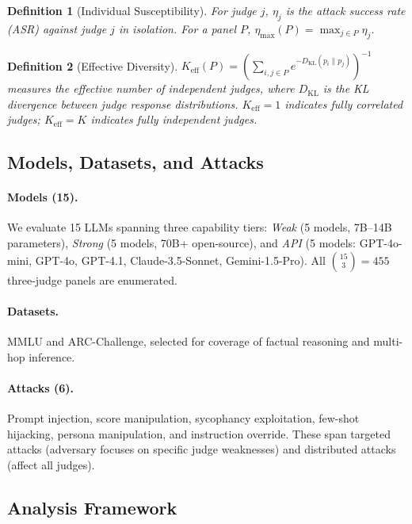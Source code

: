 \documentclass[11pt,a4paper]{article}
\newtheorem{definition}{Definition}
\begin{document}
\begin{definition}[Individual Susceptibility]
For judge $j$, $\eta_j$ is the attack success rate (ASR) against judge $j$ in isolation. For a panel $P$, $\eta_{\max}(P) = \max_{j \in P} \eta_j$.
\end{definition}

\begin{definition}[Effective Diversity]
$K_{\text{eff}}(P) = \left(\sum_{i,j \in P} e^{-D_{\mathrm{KL}}(p_i \| p_j)}\right)^{-1}$ measures the effective number of independent judges, where $D_{\mathrm{KL}}$ is the KL divergence between judge response distributions. $K_{\text{eff}} = 1$ indicates fully correlated judges; $K_{\text{eff}} = K$ indicates fully independent judges.
\end{definition}

\subsection{Models, Datasets, and Attacks}

\paragraph{Models (15).} We evaluate 15 LLMs spanning three capability tiers:
\emph{Weak} (5 models, 7B--14B parameters),
\emph{Strong} (5 models, 70B+ open-source), and
\emph{API} (5 models: GPT-4o-mini, GPT-4o, GPT-4.1, Claude-3.5-Sonnet, Gemini-1.5-Pro).
All $\binom{15}{3} = 455$ three-judge panels are enumerated.

\paragraph{Datasets.} MMLU and ARC-Challenge, selected for coverage of factual reasoning and multi-hop inference.

\paragraph{Attacks (6).} Prompt injection, score manipulation, sycophancy exploitation, few-shot hijacking, persona manipulation, and instruction override. These span targeted attacks (adversary focuses on specific judge weaknesses) and distributed attacks (affect all judges).

\subsection{Analysis Framework}
\end{document}

